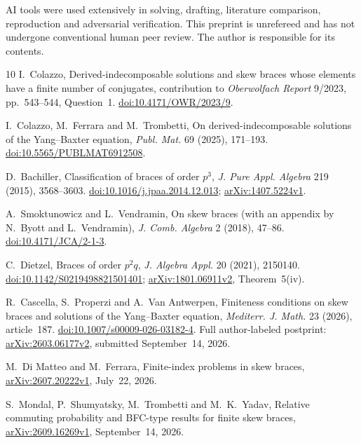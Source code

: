 \documentclass[11pt]{article}
\begin{document}
AI tools were used extensively in solving, drafting, literature
comparison, reproduction and adversarial verification.
This preprint is unrefereed and has not undergone conventional human
peer review. The author is responsible for its contents.

\begin{thebibliography}{10}
I.~Colazzo, Derived-indecomposable solutions and skew braces whose
elements have a finite number of conjugates, contribution to
\emph{Oberwolfach Report} 9/2023, pp.~543--544, Question~1.
\href{https://doi.org/10.4171/OWR/2023/9}{doi:10.4171/OWR/2023/9}.

I.~Colazzo, M.~Ferrara and M.~Trombetti,
On derived-indecomposable solutions of the Yang--Baxter equation,
\emph{Publ. Mat.} 69 (2025), 171--193.
\href{https://doi.org/10.5565/PUBLMAT6912508}{doi:10.5565/PUBLMAT6912508}.

D.~Bachiller, Classification of braces of order $p^3$,
\emph{J. Pure Appl. Algebra} 219 (2015), 3568--3603.
\href{https://doi.org/10.1016/j.jpaa.2014.12.013}
{doi:10.1016/j.jpaa.2014.12.013};
\href{https://arxiv.org/abs/1407.5224v1}{arXiv:1407.5224v1}.

A.~Smoktunowicz and L.~Vendramin,
On skew braces (with an appendix by N.~Byott and L.~Vendramin),
\emph{J. Comb. Algebra} 2 (2018), 47--86.
\href{https://doi.org/10.4171/JCA/2-1-3}{doi:10.4171/JCA/2-1-3}.

C.~Dietzel, Braces of order $p^2q$,
\emph{J. Algebra Appl.} 20 (2021), 2150140.
\href{https://doi.org/10.1142/S0219498821501401}
{doi:10.1142/S0219498821501401};
\href{https://arxiv.org/abs/1801.06911v2}{arXiv:1801.06911v2},
Theorem~5(iv).

R.~Cascella, S.~Properzi and A.~Van Antwerpen,
Finiteness conditions on skew braces and solutions of the
Yang--Baxter equation, \emph{Mediterr. J. Math.} 23 (2026), article~187.
\href{https://doi.org/10.1007/s00009-026-03182-4}
{doi:10.1007/s00009-026-03182-4}.
Full author-labeled postprint:
\href{https://arxiv.org/abs/2603.06177v2}{arXiv:2603.06177v2},
submitted September~14, 2026.

M.~Di Matteo and M.~Ferrara, Finite-index problems in skew braces,
\href{https://arxiv.org/abs/2607.20222v1}{arXiv:2607.20222v1},
July~22, 2026.

S.~Mondal, P.~Shumyatsky, M.~Trombetti and M.~K.~Yadav,
Relative commuting probability and BFC-type results for finite
skew braces,
\href{https://arxiv.org/abs/2609.16269v1}{arXiv:2609.16269v1},
September~14, 2026.


\end{thebibliography}
\end{document}
